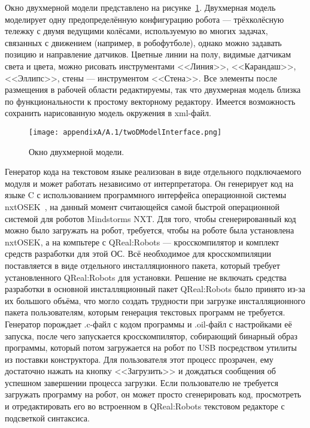 Окно двухмерной модели представлено на рисунке~\ref{image:twoDModelInterface}. Двухмерная 
модель моделирует одну предопределённую конфигурацию робота --- трёхколёсную тележку 
с двумя ведущими колёсами, используемую во многих задачах, связанных с движением (например, 
в робофутболе), однако можно задавать позицию и направление датчиков. Цветные линии 
на полу, видимые датчикам света и цвета, можно рисовать инструментами <<Линия>>, <<Карандаш>>, 
<<Эллипс>>, стены --- инструментом <<Стена>>. Все элементы после размещения в рабочей 
области редактируемы, так что двухмерная модель близка по функциональности к простому 
векторному редактору. Имеется возможность сохранить нарисованную модель окружения в xml-файл.

\begin{figure} [ht]
	\begin{center}
		\texttt{[image: appendixA/A.1/twoDModelInterface.png]}
		\caption{Окно двухмерной модели.}
		\label{image:twoDModelInterface}
	\end{center}
\end{figure}

Генератор кода на текстовом языке реализован в виде отдельного подключаемого модуля 
и может работать независимо от интерпретатора. Он генерирует код на языке C с использованием 
программного интерфейса операционной системы nxtOSEK~\cite{nxtOSEK},
на данный момент считающейся самой быстрой операционной системой для роботов Mindstorms NXT. 
Для того, чтобы сгенерированный код можно было загружать на робот, требуется, чтобы 
на роботе была установлена nxtOSEK, а на компьтере с QReal:Robots --- кросскомпилятор 
и комплект средств разработки для этой ОС. Всё необходимое для кросскомпиляции поставляется 
в виде отдельного инсталляционного пакета, который требует установленного QReal:Robots 
для установки. Решение не включать средства разработки в основной инсталляционный 
пакет QReal:Robots было принято из-за их большого объёма, что могло создать трудности 
при загрузке инсталляционного пакета пользователям, которым генерация текстовых программ 
не требуется. Генератор порождает .c-файл с кодом программы и .oil-файл с настройками 
её запуска, после чего запускается кросскомпилятор, собирающий бинарный образ программы, 
который потом загружается на робот по USB посредством утилиты из поставки конструктора. 
Для пользователя этот процесс прозрачен, ему достаточно нажать на кнопку <<Загрузить>> 
и дождаться сообщения об успешном завершении процесса загрузки. Если пользователю 
не требуется загружать программу на робот, он может просто сгенерировать код, просмотреть 
и отредактировать его во встроенном в QReal:Robots текстовом редакторе с подсветкой синтаксиса.

